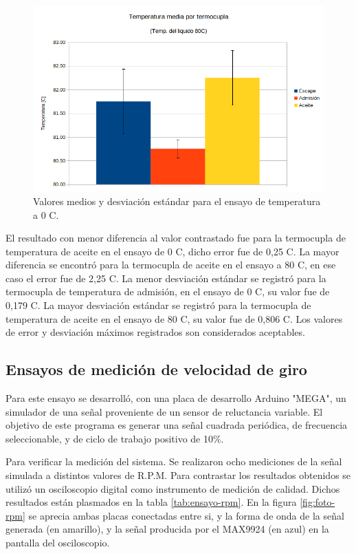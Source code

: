 \begin{figure}[htpb]
\centering
\includegraphics[width=.9\textwidth]{./Figures/temp-80c.png}
\caption{Valores medios y desviación estándar para el ensayo de temperatura a 0 \degree C.}
\label{fig:temp-80c}
\end{figure}

El resultado con menor diferencia al valor contrastado fue para la termocupla de temperatura de aceite en el ensayo de 0 \degree C, dicho error fue de 0,25 \degree C. La mayor diferencia se encontró para la termocupla de aceite en el ensayo a 80 \degree C, en ese caso el error fue de 2,25 \degree C. La menor desviación estándar se registró para la termocupla de temperatura de admisión, en el ensayo de 0 \degree C, su valor fue de 0,179 \degree C. La mayor desviación estándar se registró para la termocupla de temperatura de aceite en el ensayo de 80 \degree C, su valor fue de 0,806 \degree C.  Los valores de error y desviación máximos registrados son considerados aceptables.

\break

\subsection{Ensayos de medición de velocidad de giro}

Para este ensayo se desarrolló, con una placa de desarrollo Arduino "MEGA", un simulador de una señal proveniente de un sensor de reluctancia variable. El objetivo de este programa es generar una señal cuadrada periódica, de frecuencia seleccionable, y de ciclo de trabajo positivo de 10\%.

Para verificar la medición del sistema. Se realizaron ocho mediciones de la señal simulada a distintos valores de R.P.M. Para contrastar los resultados obtenidos se utilizó un osciloscopio digital como instrumento de medición de calidad. Dichos resultados están plasmados en la tabla \ref{tab:ensayo-rpm}. En la figura \ref{fig:foto-rpm} se aprecia ambas placas conectadas entre si, y la forma de onda de la señal generada (en amarillo), y la señal producida por el MAX9924 (en azul) en la pantalla del osciloscopio.

